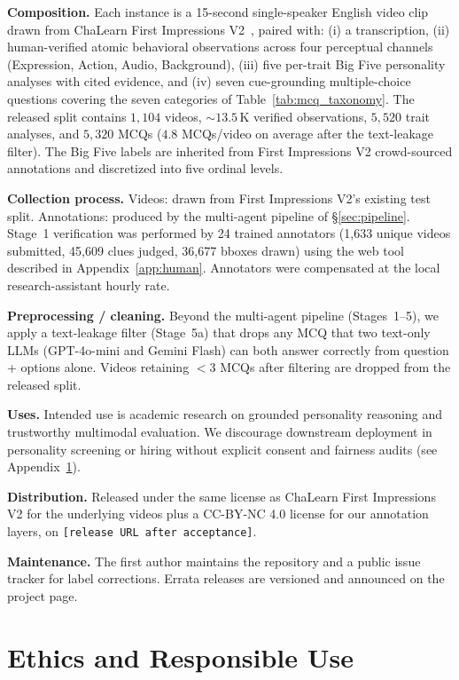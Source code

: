 \documentclass{llmxive}
\begin{document}
\noindent\textbf{Composition.} Each instance is a 15-second single-speaker English video clip drawn from ChaLearn First Impressions V2~\cite{escalante2020modeling}, paired with: (i) a transcription, (ii) human-verified atomic behavioral observations across four perceptual channels (Expression, Action, Audio, Background), (iii) five per-trait Big Five personality analyses with cited evidence, and (iv) seven cue-grounding multiple-choice questions covering the seven categories of Table~\ref{tab:mcq_taxonomy}. The released split contains $1{,}104$ videos, $\sim\!13.5$\,K verified observations, $5{,}520$ trait analyses, and $5{,}320$ MCQs ($4.8$ MCQs/video on average after the text-leakage filter). The Big Five labels are inherited from First Impressions V2 crowd-sourced annotations and discretized into five ordinal levels.

\noindent\textbf{Collection process.} Videos: drawn from First Impressions V2's existing test split. Annotations: produced by the multi-agent pipeline of \S\ref{sec:pipeline}. Stage~1 verification was performed by 24 trained annotators (1,633 unique videos submitted, 45,609 clues judged, 36,677 bboxes drawn) using the web tool described in Appendix~\ref{app:human}. Annotators were compensated at the local research-assistant hourly rate.

\noindent\textbf{Preprocessing / cleaning.} Beyond the multi-agent pipeline (Stages~1--5), we apply a text-leakage filter (Stage~5a) that drops any MCQ that two text-only LLMs (GPT-4o-mini and Gemini Flash) can both answer correctly from question + options alone. Videos retaining $<\!3$ MCQs after filtering are dropped from the released split.

\noindent\textbf{Uses.} Intended use is academic research on grounded personality reasoning and trustworthy multimodal evaluation. We discourage downstream deployment in personality screening or hiring without explicit consent and fairness audits (see Appendix~\ref{app:ethics}).

\noindent\textbf{Distribution.} Released under the same license as ChaLearn First Impressions V2 for the underlying videos plus a CC-BY-NC 4.0 license for our annotation layers, on \texttt{[release URL after acceptance]}.

\noindent\textbf{Maintenance.} The first author maintains the repository and a public issue tracker for label corrections. Errata releases are versioned and announced on the project page.

\section{Ethics and Responsible Use}
\label{app:ethics}
\end{document}
